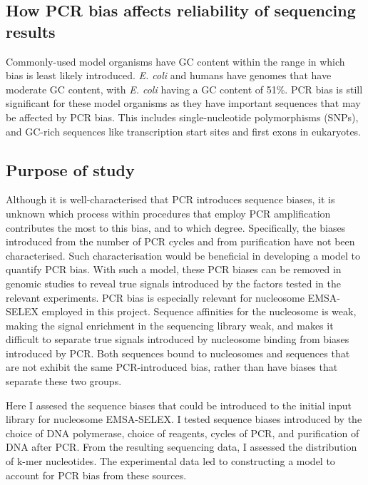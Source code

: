 \documentclass[parskip=full, numbers=noenddot]{scrreprt}
\begin{document}
\subsection{How PCR bias affects reliability of sequencing results}
\label{ssec:pcrbias_intro_effects}

Commonly-used model organisms have GC content within the range in which bias is least likely introduced.  \emph{E. coli} and humans have genomes that have moderate GC content, with \emph{E. coli} having a GC content of 51\%.  PCR bias is still significant for these model organisms as they have important sequences that may be affected by PCR bias.  This includes single-nucleotide polymorphisms (SNPs), and GC-rich sequences like transcription start sites and first exons in eukaryotes.  %

\subsection{Purpose of study}
\label{ssec:pcrbias_intro_why}

Although it is well-characterised that PCR introduces sequence biases, it is unknown which process within procedures that employ PCR amplification contributes the most to this bias, and to which degree.  Specifically, the biases introduced from the number of PCR cycles and from purification have not been characterised.  Such characterisation would be beneficial in developing a model to quantify PCR bias.  With such a model, these PCR biases can be removed in genomic studies to reveal true signals introduced by the factors tested in the relevant experiments.  PCR bias is especially relevant for nucleosome EMSA-SELEX employed in this project.  Sequence affinities for the nucleosome is weak, making the signal enrichment in the sequencing library weak, and makes it difficult to separate true signals introduced by nucleosome binding from biases introduced by PCR.  Both sequences bound to nucleosomes and sequences that are not exhibit the same PCR-introduced bias, rather than have biases that separate these two groups.

Here I assesed the sequence biases that could be introduced to the initial input library for nucleosome EMSA-SELEX.  I tested sequence biases introduced by the choice of DNA polymerase, choice of reagents, cycles of PCR, and purification of DNA after PCR.  From the resulting sequencing data, I assessed the distribution of k-mer nucleotides.  The experimental data led to constructing a model to account for PCR bias from these sources.
\end{document}
